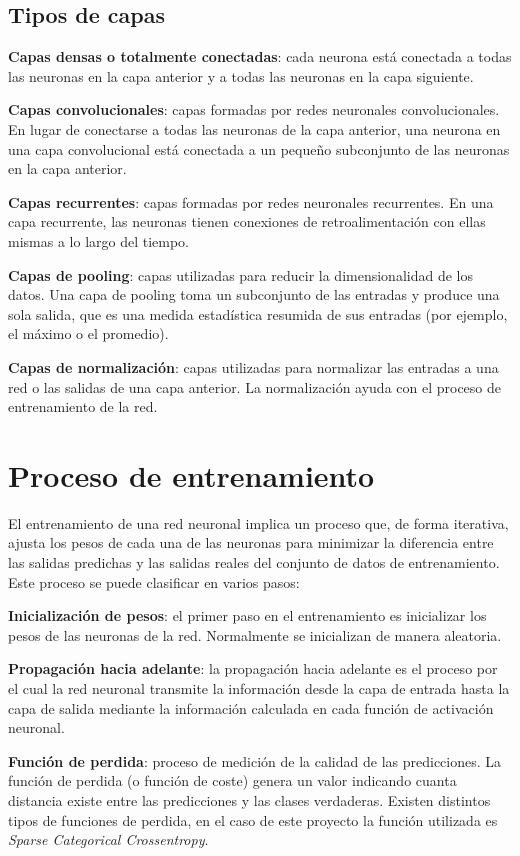 \subsection{Tipos de capas}

\textbf{Capas densas o totalmente conectadas}: cada neurona está conectada a todas las neuronas en la capa anterior y a todas las neuronas en la capa siguiente.

\textbf{Capas convolucionales}: capas formadas por redes neuronales convolucionales. En lugar de conectarse a todas las neuronas de la capa anterior, una neurona en una capa convolucional está conectada a un pequeño subconjunto de las neuronas en la capa anterior.

\textbf{Capas recurrentes}: capas formadas por redes neuronales recurrentes. En una capa recurrente, las neuronas tienen conexiones de retroalimentación con ellas mismas a lo largo del tiempo.

\textbf{Capas de pooling}: capas utilizadas para reducir la dimensionalidad de los datos. Una capa de pooling toma un subconjunto de las entradas y produce una sola salida, que es una medida estadística resumida de sus entradas (por ejemplo, el máximo o el promedio).

\textbf{Capas de normalización}: capas utilizadas para normalizar las entradas a una red o las salidas de una capa anterior. La normalización ayuda con el proceso de entrenamiento de la red.

\section{Proceso de entrenamiento}
El entrenamiento de una red neuronal implica un proceso que, de forma iterativa, ajusta los pesos de cada una de las neuronas para minimizar la diferencia entre las salidas predichas y las salidas reales del conjunto de datos de entrenamiento. Este proceso se puede clasificar en varios pasos:

\textbf{Inicialización de pesos}: el primer paso en el entrenamiento es inicializar los pesos de las neuronas de la red. Normalmente se inicializan de manera aleatoria.

\textbf{Propagación hacia adelante}: la propagación hacia adelante es el proceso por el cual la red neuronal transmite la información desde la capa de entrada hasta la capa de salida mediante la información calculada en cada función de activación neuronal.

\textbf{Función de perdida}: proceso de medición de la calidad de las predicciones. La función de perdida (o función de coste) genera un valor indicando cuanta distancia existe entre las predicciones y las clases verdaderas. Existen distintos tipos de funciones de perdida, en el caso de este proyecto la función utilizada es \textit{Sparse Categorical Crossentropy}.


